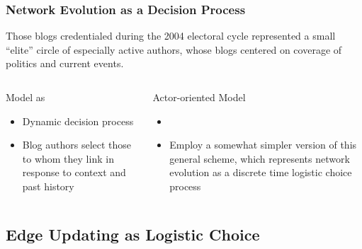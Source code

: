 \documentclass{beamer}
\begin{document}
\begin{frame}
\frametitle{Network Evolution as a Decision Process}

\begin{block}{}
Those blogs credentialed during the 2004 electoral cycle represented a small ``elite'' circle of especially active authors, whose blogs centered on coverage of politics and current events.
\end{block}

\begin{columns}


\begin{block}{Model as}
\begin{itemize}
\item Dynamic decision process
\item Blog authors select those to whom they link in response to context and past history
\end{itemize}
\end{block}



\begin{block}{Actor-oriented Model}
\begin{itemize}
\item \citep{snijders96,snijders97,snijders01}
\item Employ a somewhat simpler version of this general scheme, which represents network evolution as a discrete time logistic choice process \citep{mcfadden76,mcfadden74}
\end{itemize}
\end{block}

\end{columns}


\end{frame}

\subsection{Edge Updating as Logistic Choice}

\end{document}
